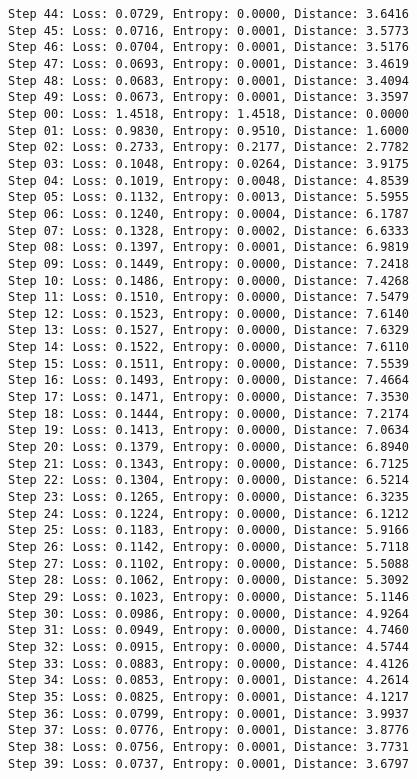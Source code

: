 \documentclass[11pt]{article}
\begin{document}
\begin{Verbatim}[commandchars=\\\{\}]
Step 44: Loss: 0.0729, Entropy: 0.0000, Distance: 3.6416
Step 45: Loss: 0.0716, Entropy: 0.0001, Distance: 3.5773
Step 46: Loss: 0.0704, Entropy: 0.0001, Distance: 3.5176
Step 47: Loss: 0.0693, Entropy: 0.0001, Distance: 3.4619
Step 48: Loss: 0.0683, Entropy: 0.0001, Distance: 3.4094
Step 49: Loss: 0.0673, Entropy: 0.0001, Distance: 3.3597
Step 00: Loss: 1.4518, Entropy: 1.4518, Distance: 0.0000
Step 01: Loss: 0.9830, Entropy: 0.9510, Distance: 1.6000
Step 02: Loss: 0.2733, Entropy: 0.2177, Distance: 2.7782
Step 03: Loss: 0.1048, Entropy: 0.0264, Distance: 3.9175
Step 04: Loss: 0.1019, Entropy: 0.0048, Distance: 4.8539
Step 05: Loss: 0.1132, Entropy: 0.0013, Distance: 5.5955
Step 06: Loss: 0.1240, Entropy: 0.0004, Distance: 6.1787
Step 07: Loss: 0.1328, Entropy: 0.0002, Distance: 6.6333
Step 08: Loss: 0.1397, Entropy: 0.0001, Distance: 6.9819
Step 09: Loss: 0.1449, Entropy: 0.0000, Distance: 7.2418
Step 10: Loss: 0.1486, Entropy: 0.0000, Distance: 7.4268
Step 11: Loss: 0.1510, Entropy: 0.0000, Distance: 7.5479
Step 12: Loss: 0.1523, Entropy: 0.0000, Distance: 7.6140
Step 13: Loss: 0.1527, Entropy: 0.0000, Distance: 7.6329
Step 14: Loss: 0.1522, Entropy: 0.0000, Distance: 7.6110
Step 15: Loss: 0.1511, Entropy: 0.0000, Distance: 7.5539
Step 16: Loss: 0.1493, Entropy: 0.0000, Distance: 7.4664
Step 17: Loss: 0.1471, Entropy: 0.0000, Distance: 7.3530
Step 18: Loss: 0.1444, Entropy: 0.0000, Distance: 7.2174
Step 19: Loss: 0.1413, Entropy: 0.0000, Distance: 7.0634
Step 20: Loss: 0.1379, Entropy: 0.0000, Distance: 6.8940
Step 21: Loss: 0.1343, Entropy: 0.0000, Distance: 6.7125
Step 22: Loss: 0.1304, Entropy: 0.0000, Distance: 6.5214
Step 23: Loss: 0.1265, Entropy: 0.0000, Distance: 6.3235
Step 24: Loss: 0.1224, Entropy: 0.0000, Distance: 6.1212
Step 25: Loss: 0.1183, Entropy: 0.0000, Distance: 5.9166
Step 26: Loss: 0.1142, Entropy: 0.0000, Distance: 5.7118
Step 27: Loss: 0.1102, Entropy: 0.0000, Distance: 5.5088
Step 28: Loss: 0.1062, Entropy: 0.0000, Distance: 5.3092
Step 29: Loss: 0.1023, Entropy: 0.0000, Distance: 5.1146
Step 30: Loss: 0.0986, Entropy: 0.0000, Distance: 4.9264
Step 31: Loss: 0.0949, Entropy: 0.0000, Distance: 4.7460
Step 32: Loss: 0.0915, Entropy: 0.0000, Distance: 4.5744
Step 33: Loss: 0.0883, Entropy: 0.0000, Distance: 4.4126
Step 34: Loss: 0.0853, Entropy: 0.0001, Distance: 4.2614
Step 35: Loss: 0.0825, Entropy: 0.0001, Distance: 4.1217
Step 36: Loss: 0.0799, Entropy: 0.0001, Distance: 3.9937
Step 37: Loss: 0.0776, Entropy: 0.0001, Distance: 3.8776
Step 38: Loss: 0.0756, Entropy: 0.0001, Distance: 3.7731
Step 39: Loss: 0.0737, Entropy: 0.0001, Distance: 3.6797

\end{Verbatim}
\end{document}
